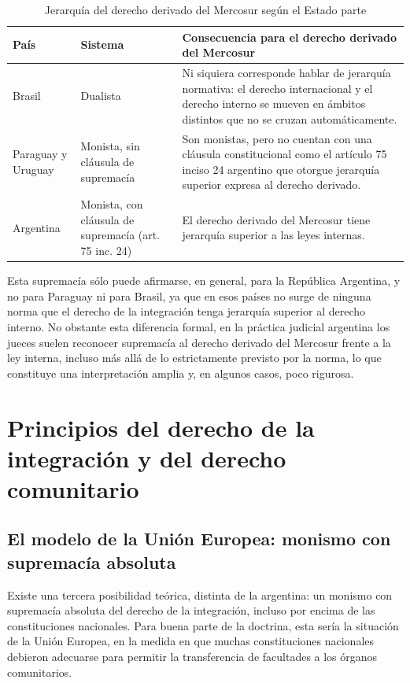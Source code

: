 \documentclass[12pt,oneside]{book}
\begin{document}
\begin{table}[H]
\centering
\caption{Jerarquía del derecho derivado del Mercosur según el Estado parte}
\begin{tabularx}{\textwidth}{@{}>{\raggedright\arraybackslash}p{}>{\raggedright\arraybackslash}p{}X@{}}
\toprule
\textbf{País} & \textbf{Sistema} & \textbf{Consecuencia para el derecho derivado del Mercosur} \\
\midrule
Brasil & Dualista & Ni siquiera corresponde hablar de jerarquía normativa: el derecho internacional y el derecho interno se mueven en ámbitos distintos que no se cruzan automáticamente. \\
\addlinespace
Paraguay y Uruguay & Monista, sin cláusula de supremacía & Son monistas, pero no cuentan con una cláusula constitucional como el artículo 75 inciso 24 argentino que otorgue jerarquía superior expresa al derecho derivado. \\
\addlinespace
Argentina & Monista, con cláusula de supremacía (art. 75 inc. 24) & El derecho derivado del Mercosur tiene jerarquía superior a las leyes internas. \\
\bottomrule
\end{tabularx}
\end{table}

Esta supremacía sólo puede afirmarse, en general, para la República Argentina, y no para Paraguay ni para Brasil, ya que en esos países no surge de ninguna norma que el derecho de la integración tenga jerarquía superior al derecho interno. No obstante esta diferencia formal, en la práctica judicial argentina los jueces suelen reconocer supremacía al derecho derivado del Mercosur frente a la ley interna, incluso más allá de lo estrictamente previsto por la norma, lo que constituye una interpretación amplia y, en algunos casos, poco rigurosa.

\section{Principios del derecho de la integración y del derecho comunitario}

\subsection{El modelo de la Unión Europea: monismo con supremacía absoluta}

Existe una tercera posibilidad teórica, distinta de la argentina: un monismo con supremacía absoluta del derecho de la integración, incluso por encima de las constituciones nacionales. Para buena parte de la doctrina, esta sería la situación de la Unión Europea, en la medida en que muchas constituciones nacionales debieron adecuarse para permitir la transferencia de facultades a los órganos comunitarios.
\end{document}
